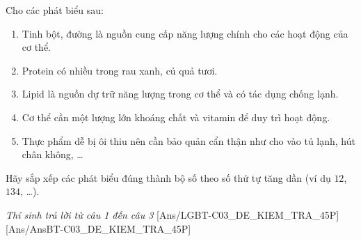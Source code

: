\documentclass[Main.tex]{subfiles}
\begin{document}
\begin{ex}%
	Cho các phát biểu sau:
	\begin{enumerate}[(1)]
		\item Tinh bột, đường là nguồn cung cấp năng lượng chính cho các hoạt động của cơ thể.
		\item Protein có nhiều trong rau xanh, củ quả tươi.
		\item Lipid là nguồn dự trữ năng lượng trong cơ thể và có tác dụng chống lạnh.
		\item Cơ thể cần một lượng lớn khoáng chất và vitamin để duy trì hoạt động.
		\item Thực phẩm dễ bị ôi thiu nên cần bảo quản cẩn thận như cho vào tủ lạnh, hút chân không, …
	\end{enumerate}
	Hãy sắp xếp các phát biểu đúng thành bộ số theo số thứ tự tăng dần (ví dụ $12$, $134$, …).
\end{ex}
\textit{\large Thí sinh trả lời từ câu 1 đến câu 3}
[Ans/LGBT-C03_DE_KIEM_TRA_45P]
[Ans/AnsBT-C03_DE_KIEM_TRA_45P]
\end{document}
